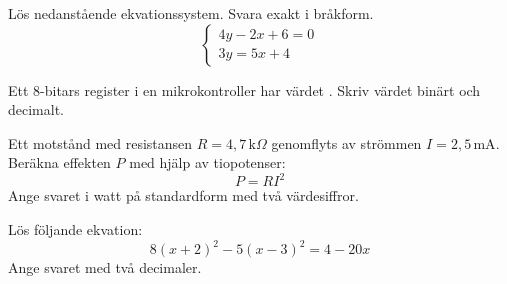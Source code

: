 Lös nedanstående ekvationssystem. Svara exakt i bråkform.
\[
  \begin{cases}
    4y - 2x + 6 = 0 \\
    3y = 5x + 4
  \end{cases}
\]

Ett 8-bitars register i en mikrokontroller har värdet . Skriv värdet binärt och
decimalt.

Ett motstånd med resistansen $R = 4{,}7\,\text{k}\Omega$ genomflyts av strömmen
$I = 2{,}5\,\text{mA}$. Beräkna effekten $P$ med hjälp av tiopotenser:
\[
  P = RI^2
\]
Ange svaret i watt på standardform med två värdesiffror.

Lös följande ekvation:
\[
  8(x + 2)^2 - 5(x - 3)^2 = 4 - 20x
\]
Ange svaret med två decimaler.
